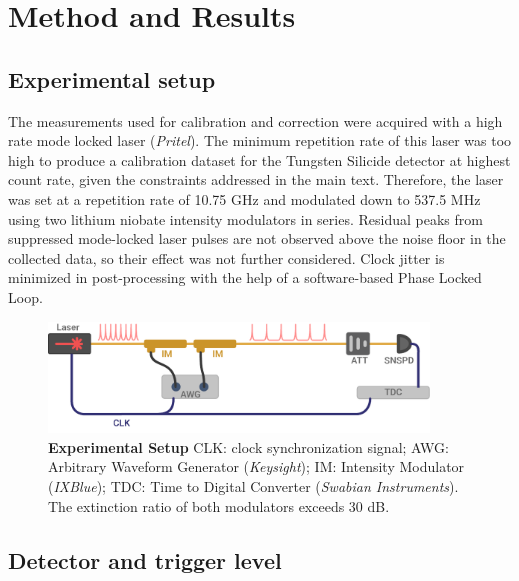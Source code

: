 \documentclass[11pt]{caltech_thesis} %
\begin{document}
\hypertarget{method-and-results}{%
\section{Method and Results}\label{method-and-results}}

\hypertarget{experimental-setup}{%
\subsection{Experimental setup}\label{experimental-setup}}

The measurements used for calibration and correction were acquired with
a high rate mode locked laser (\emph{Pritel}). The minimum repetition
rate of this laser was too high to produce a calibration dataset for the
Tungsten Silicide detector at highest count rate, given the constraints
addressed in the main text. Therefore, the laser was set at a repetition
rate of 10.75 GHz and modulated down to 537.5 MHz using two lithium
niobate intensity modulators in series. Residual peaks from suppressed
mode-locked laser pulses are not observed above the noise floor in the
collected data, so their effect was not further considered. Clock jitter
is minimized in post-processing with the help of a software-based Phase
Locked Loop.

\hypertarget{fig:jitterate_exp_setup}{%
\begin{figure}
\centering
\includegraphics[width=0.9\textwidth,height=\textheight]{chapter_02/figs_02/supplemental_expirement_light.pdf}
\caption[{Time walk experiment setup}]{\textbf{Experimental Setup} CLK:
clock synchronization signal; AWG: Arbitrary Waveform Generator
(\emph{Keysight}); IM: Intensity Modulator (\emph{IXBlue}); TDC: Time to
Digital Converter (\emph{Swabian Instruments}). The extinction ratio of
both modulators exceeds 30 dB.}
\label{fig:jitterate_exp_setup}
\end{figure}
}

\hypertarget{detector-and-trigger-level}{%
\subsection{Detector and trigger
level}\label{detector-and-trigger-level}}
\end{document}
